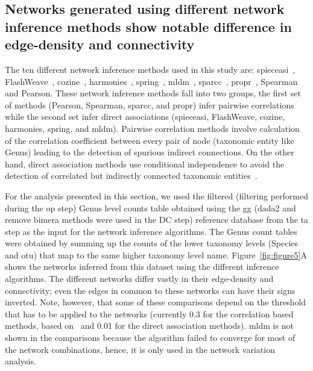   \FloatBarrier

  \subsection*{Networks generated using different network inference methods show notable difference in edge-density and connectivity}

  The ten different network inference methods used in this study are: \ac{spieceasi}~\cite{Kurtz2015}, FlashWeave~\cite{tackmannRapidInferenceDirect2019}, \ac{cozine}~\cite{haCompositionalZeroinflatedNetwork2020a}, \ac{harmonies}~\cite{jiangHARMONIESHybridApproach2020}, \ac{spring}~\cite{yoonMicrobialNetworksSPRING2019}, \ac{mldm}~\cite{Yang2017}, \ac{sparcc}~\cite{Friedman2012,Watts2018}, propr~\cite{quinnProprRpackageIdentifying2017}, Spearman and Pearson.
  These network inference methods fall into two groups, the first set of methods (Pearson, Spearman, \ac{sparcc}, and propr) infer pairwise correlations while the second set infer direct associations (\ac{spieceasi}, FlashWeave, \ac{cozine}, \ac{harmonies}, \ac{spring}, and \ac{mldm}).
  Pairwise correlation methods involve calculation of the correlation coefficient between every pair of node (taxonomic entity like Genus) leading to the detection of spurious indirect connections.
  On the other hand, direct association methods use conditional independence to avoid the detection of correlated but indirectly connected taxonomic entities~\cite{Kurtz2015,Menon2018}.

  For the analysis presented in this section, we used the filtered (filtering performed during the \ac{op} step) Genus level counts table obtained using the \ac{gg} (dada2 and remove bimera methods were used in the DC step) reference database from the \ac{ta} step as the input for the network inference algorithms.
  The Genus count tables were obtained by summing up the counts of the lower taxonomy levels (Species and \ac{otu}) that map to the same higher taxonomy level name.
  Figure~\ref{fig:figure5}A shows the networks inferred from this dataset using the different inference algorithms.
  The different networks differ vastly in their edge-density and connectivity; even the edges in common to these networks can have their signs inverted.
  Note, however, that some of these comparisons depend on the threshold that has to be applied to the networks (currently 0.3 for the correlation based methods, based on~\cite{Friedman2012} and 0.01 for the direct association methods).
  \ac{mldm} is not shown in the comparisons because the algorithm failed to converge for most of the network combinations, hence, it is only used in the network variation analysis.

